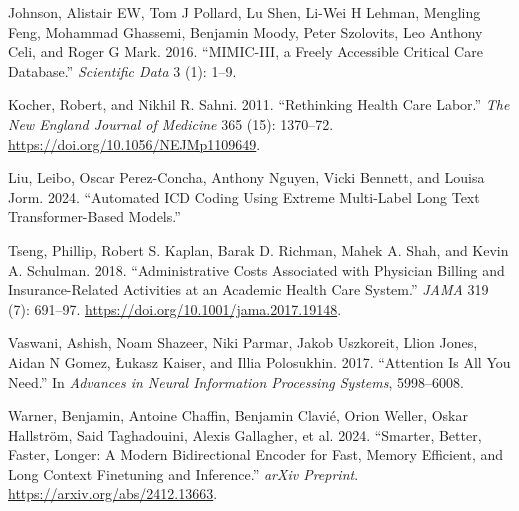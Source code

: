 \documentclass[
]{article}
\newlength{\cslhangindent}
\newenvironment{CSLReferences}[2] %
 {\begin{list}{}{%
  \setlength{\itemindent}{0pt}
  \setlength{\leftmargin}{0pt}
  \setlength{\parsep}{0pt}
  \ifodd #1
   \setlength{\leftmargin}{\cslhangindent}
   \setlength{\itemindent}{-1\cslhangindent}
  \fi
  \setlength{\itemsep}{#2\baselineskip}}}
 {\end{list}}
\begin{document}
\begin{CSLReferences}{1}{0}
Johnson, Alistair EW, Tom J Pollard, Lu Shen, Li-Wei H Lehman, Mengling
Feng, Mohammad Ghassemi, Benjamin Moody, Peter Szolovits, Leo Anthony
Celi, and Roger G Mark. 2016. {``MIMIC-III, a Freely Accessible Critical
Care Database.''} \emph{Scientific Data} 3 (1): 1--9.

Kocher, Robert, and Nikhil R. Sahni. 2011. {``Rethinking Health Care
Labor.''} \emph{The New England Journal of Medicine} 365 (15): 1370--72.
\url{https://doi.org/10.1056/NEJMp1109649}.

Liu, Leibo, Oscar Perez-Concha, Anthony Nguyen, Vicki Bennett, and
Louisa Jorm. 2024. {``Automated ICD Coding Using Extreme Multi-Label
Long Text Transformer-Based Models.''}

Tseng, Phillip, Robert S. Kaplan, Barak D. Richman, Mahek A. Shah, and
Kevin A. Schulman. 2018. {``Administrative Costs Associated with
Physician Billing and Insurance-Related Activities at an Academic Health
Care System.''} \emph{JAMA} 319 (7): 691--97.
\url{https://doi.org/10.1001/jama.2017.19148}.

Vaswani, Ashish, Noam Shazeer, Niki Parmar, Jakob Uszkoreit, Llion
Jones, Aidan N Gomez, Łukasz Kaiser, and Illia Polosukhin. 2017.
{``Attention Is All You Need.''} In \emph{Advances in Neural Information
Processing Systems}, 5998--6008.

Warner, Benjamin, Antoine Chaffin, Benjamin Clavié, Orion Weller, Oskar
Hallström, Said Taghadouini, Alexis Gallagher, et al. 2024. {``Smarter,
Better, Faster, Longer: A Modern Bidirectional Encoder for Fast, Memory
Efficient, and Long Context Finetuning and Inference.''} \emph{arXiv
Preprint}. \url{https://arxiv.org/abs/2412.13663}.

\end{CSLReferences}
\end{document}
